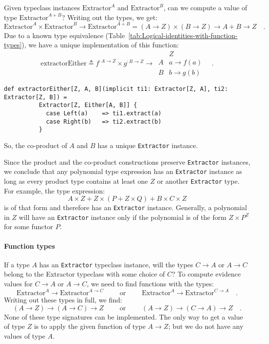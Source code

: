 Given typeclass instances $\text{Extractor}^{A}$ and $\text{Extractor}^{B}$,
can we compute a value of type $\text{Extractor}^{A+B}$? Writing
out the types, we get:
\[
\text{Extractor}^{A}\times\text{Extractor}^{B}\rightarrow\text{Extractor}^{A+B}=\left(A\rightarrow Z\right)\times\left(B\rightarrow Z\right)\rightarrow A+B\rightarrow Z\quad.
\]
Due to a known type equivalence (Table~\ref{tab:Logical-identities-with-function-types}),
we have a unique implementation of this function:
\[
\text{extractorEither}\triangleq f^{:A\rightarrow Z}\times g^{:B\rightarrow Z}\rightarrow\,\begin{array}{|c||c|}
 & Z\\
\hline A & a\rightarrow f(a)\\
B & b\rightarrow g(b)
\end{array}\quad.
\]
\begin{lstlisting}
def extractorEither[Z, A, B](implicit ti1: Extractor[Z, A], ti2: Extractor[Z, B]) =
          Extractor[Z, Either[A, B]] {
            case Left(a)    => ti1.extract(a)
            case Right(b)   => ti2.extract(b)
          }
\end{lstlisting}
So, the co-product of $A$ and $B$ has a unique \lstinline!Extractor!
instance.

Since the product and the co-product constructions preserve \lstinline!Extractor!
instances, we conclude that any polynomial type expression has an
\lstinline!Extractor! instance as long as every product type contains
at least one $Z$ or another \lstinline!Extractor! type. For example,
the type expression: 
\[
A\times Z+Z\times(P+Z\times Q)+B\times C\times Z
\]
is of that form and therefore has an \lstinline!Extractor! instance.
Generally, a polynomial in $Z$ will have an \lstinline!Extractor!
instance only if the polynomial is of the form $Z\times P^{Z}$ for
some functor $P$.

\paragraph{Function types}

If a type $A$ has an \lstinline!Extractor! typeclass instance, will
the types $C\rightarrow A$ or $A\rightarrow C$ belong to the Extractor
typeclass with some choice of $C$? To compute evidence values for
$C\rightarrow A$ or $A\rightarrow C$, we need to find functions
with the types:
\[
\text{Extractor}^{A}\rightarrow\text{Extractor}^{A\rightarrow C}\quad\quad\text{ or }\quad\quad\text{Extractor}^{A}\rightarrow\text{Extractor}^{C\rightarrow A}\quad.
\]
Writing out these types in full, we find:
\[
\left(A\rightarrow Z\right)\rightarrow\left(A\rightarrow C\right)\rightarrow Z\quad\quad\text{ or }\quad\quad\left(A\rightarrow Z\right)\rightarrow\left(C\rightarrow A\right)\rightarrow Z\quad.
\]
None of these type signatures can be implemented. The only way to
get a value of type $Z$ is to apply the given function of type $A\rightarrow Z$;
but we do not have any values of type $A$. 

